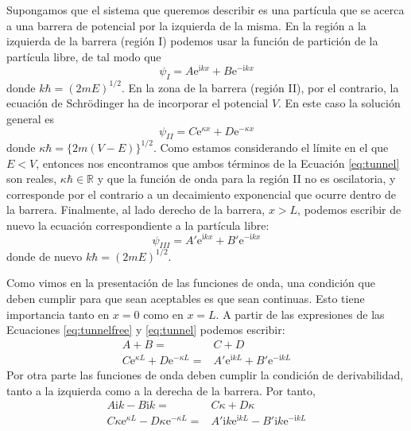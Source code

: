 \documentclass{tufte-handout}
\begin{document}
Supongamos que el sistema que queremos describir es una 
partícula que se acerca a una barrera de potencial por la 
izquierda de la misma. En la región a la izquierda de la 
barrera (región I) podemos usar la función de partición de 
la partícula libre, de tal modo que
\begin{equation}
    \psi_I=A\mathrm{e}^{\mathrm{i}kx} +
    B\mathrm{e}^{-\mathrm{i}kx}
    \label{eq:tunnelfree}
\end{equation}
donde $k\hbar=(2mE)^{1/2}$. En la zona de la barrera
(región II), por el contrario, la ecuación de Schrödinger 
ha de  incorporar el potencial $V$. En este caso la solución
general es
\begin{equation}
    \psi_{II}=C\mathrm{e}^{\kappa x} + D\mathrm{e}^{-\kappa x}
\label{eq:tunnel}
\end{equation}
donde $\kappa\hbar=\{2m(V-E)\}^{1/2}$. Como estamos
considerando el límite en el que $E<V$, entonces nos encontramos que ambos términos de la Ecuación 
\ref{eq:tunnel} son reales, $\kappa\hbar\in \mathbb{R}$ y
que la función de onda para la región II no es oscilatoria,
y corresponde por el contrario a un decaimiento exponencial
que ocurre dentro de la barrera.
Finalmente, al lado derecho de la barrera, $x>L$, podemos escribir de nuevo la ecuación 
correspondiente a la partícula libre:
\begin{equation}
    \psi_{III}=A'\mathrm{e}^{\mathrm{i}kx} + B'\mathrm{e}^{-\mathrm{i}kx}
\end{equation}
donde de nuevo $k\hbar=(2mE)^{1/2}$.

Como vimos en la presentación de las funciones de onda, 
una condición que deben cumplir para que sean aceptables 
es que sean continuas. Esto tiene importancia tanto en $x=0$
como en $x=L$. A partir de las expresiones de las Ecuaciones
\ref{eq:tunnelfree} y \ref{eq:tunnel} podemos escribir:
\begin{subequations}
    \begin{align}
         A + B =&C + D \\
         C\mathrm{e}^{\kappa L} + D\mathrm{e}^{-\kappa L}=&
         A'\mathrm{e}^{\mathrm{i}kL} + B'\mathrm{e}^{-\mathrm{i}kL}
    \end{align}
\end{subequations}
Por otra parte las funciones de onda deben cumplir la
condición de derivabilidad, tanto a la izquierda como a
la derecha de la barrera. Por tanto,
\begin{subequations}
    \begin{align}
        A\mathrm{i}k-B\mathrm{i}k =& C\kappa + D\kappa \\
        C\kappa\mathrm{e}^{\kappa L} - D\kappa\mathrm{e}^{-\kappa L} =& A'\mathrm{i}k\mathrm{e}^{\mathrm{i}kL}-B'\mathrm{i}k\mathrm{e}^{-\mathrm{i}kL}
    \end{align}
\end{subequations}
\end{document}
